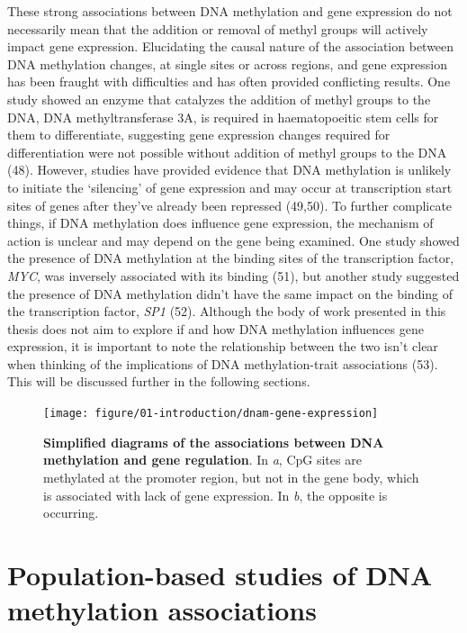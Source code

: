 \documentclass[11pt,twoside]{bristolthesis}
\begin{document}
These strong associations between DNA methylation and gene expression do not necessarily mean that the addition or removal of methyl groups will actively impact gene expression. Elucidating the causal nature of the association between DNA methylation changes, at single sites or across regions, and gene expression has been fraught with difficulties and has often provided conflicting results. One study showed an enzyme that catalyzes the addition of methyl groups to the DNA, DNA methyltransferase 3A, is required in haematopoeitic stem cells for them to differentiate, suggesting gene expression changes required for differentiation were not possible without addition of methyl groups to the DNA (48). However, studies have provided evidence that DNA methylation is unlikely to initiate the `silencing' of gene expression and may occur at transcription start sites of genes after they've already been repressed (49,50). To further complicate things, if DNA methylation does influence gene expression, the mechanism of action is unclear and may depend on the gene being examined. One study showed the presence of DNA methylation at the binding sites of the transcription factor, \emph{MYC}, was inversely associated with its binding (51), but another study suggested the presence of DNA methylation didn't have the same impact on the binding of the transcription factor, \emph{SP1} (52). Although the body of work presented in this thesis does not aim to explore if and how DNA methylation influences gene expression, it is important to note the relationship between the two isn't clear when thinking of the implications of DNA methylation-trait associations (53). This will be discussed further in the following sections.




\begin{figure}

{\centering \texttt{[image: figure/01-introduction/dnam-gene-expression]} 

}

\caption[Simplified diagrams of the associations between DNA methylation and gene regulation]{\textbf{Simplified diagrams of the associations between DNA methylation and gene regulation}. In \emph{a}, CpG sites are methylated at the promoter region, but not in the gene body, which is associated with lack of gene expression. In \emph{b}, the opposite is occurring.}\label{fig:dnam-functions}
\end{figure}
\hypertarget{dnam-phs}{%
\section{Population-based studies of DNA methylation associations}\label{dnam-phs}}
\end{document}
